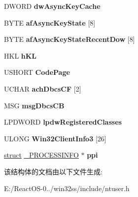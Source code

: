 \begin{DoxyCompactItemize}
D\+W\+O\+RD {\bfseries dw\+Async\+Key\+Cache}
\item 
\mbox{\label{struct___c_l_i_e_n_t_i_n_f_o_adadf9571d41d79609f8e9b7c7008c81d}} 
B\+Y\+TE {\bfseries af\+Async\+Key\+State} \mbox{[}8\mbox{]}
\item 
\mbox{\label{struct___c_l_i_e_n_t_i_n_f_o_ab682f242ee1b429e4e6a630d7d90921a}} 
B\+Y\+TE {\bfseries af\+Async\+Key\+State\+Recent\+Dow} \mbox{[}8\mbox{]}
\item 
\mbox{\label{struct___c_l_i_e_n_t_i_n_f_o_a0d4a41e97753fcff43aecff5c656e682}} 
H\+KL {\bfseries h\+KL}
\item 
\mbox{\label{struct___c_l_i_e_n_t_i_n_f_o_a0c0e52bc18e669dca11185665dc59abc}} 
U\+S\+H\+O\+RT {\bfseries Code\+Page}
\item 
\mbox{\label{struct___c_l_i_e_n_t_i_n_f_o_ac71f77cbf2ff6987ef3bbf6a31fabdd9}} 
U\+C\+H\+AR {\bfseries ach\+Dbcs\+CF} \mbox{[}2\mbox{]}
\item 
\mbox{\label{struct___c_l_i_e_n_t_i_n_f_o_a0c4dd4cd41b636a59e4bb6fd6e919be7}} 
M\+SG {\bfseries msg\+Dbcs\+CB}
\item 
\mbox{\label{struct___c_l_i_e_n_t_i_n_f_o_a3256c2e26fb662ef54d091cf73e1583b}} 
L\+P\+D\+W\+O\+RD {\bfseries lpdw\+Registered\+Classes}
\item 
\mbox{\label{struct___c_l_i_e_n_t_i_n_f_o_a46b4ef11fffe3ee0c4fb4d898831ee5a}} 
U\+L\+O\+NG {\bfseries Win32\+Client\+Info3} \mbox{[}26\mbox{]}
\item 
\mbox{\label{struct___c_l_i_e_n_t_i_n_f_o_ac1c40c42814fdca6bb3332b0ff1ab217}} 
\hyperlink{interfacestruct}{struct} \hyperlink{struct___p_r_o_c_e_s_s_i_n_f_o}{\+\_\+\+P\+R\+O\+C\+E\+S\+S\+I\+N\+FO} $\ast$ {\bfseries ppi}
\end{DoxyCompactItemize}


该结构体的文档由以下文件生成\+:\begin{DoxyCompactItemize}
\item 
E\+:/\+React\+O\+S-\/0../win32ss/include/ntuser.\+h\end{DoxyCompactItemize}
